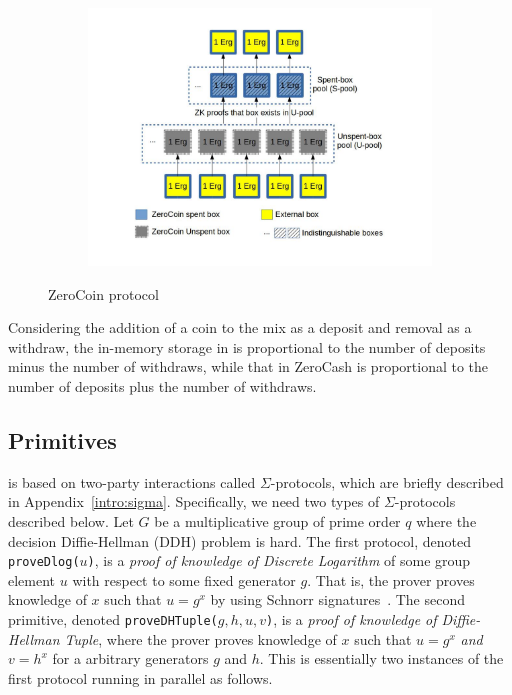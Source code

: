 \documentclass[11pt]{article}
\begin{document}
\begin{figure}
	\centering
	\begin{subfigure}{.8\textwidth}
		\centering
		\includegraphics[width=\linewidth]{ZeroCoin.jpg}
	\end{subfigure}
	\caption{ZeroCoin protocol}
	\label{fig:zerocoin}
\end{figure}

Considering the addition of a coin to the mix as a deposit and removal as a withdraw, the in-memory storage in \algname is proportional to the number of deposits minus the number of withdraws, while that in ZeroCash is proportional to the number of deposits plus the number of withdraws.  


\subsection{Primitives} 

\algname is based on two-party interactions called $\Sigma$-protocols, which are briefly described in Appendix~\ref{intro:sigma}. 
Specifically, we need two types of $\Sigma$-protocols described below. Let $G$ be a multiplicative group of prime order $q$ where the decision Diffie-Hellman (DDH) problem is hard. The first protocol, denoted \texttt{proveDlog($u$)}, is a {\em proof of knowledge of Discrete Logarithm} of some group element $u$ with respect to some fixed generator $g$. That is, the prover proves knowledge of $x$ such that $u = g^x$ by using Schnorr signatures~\cite{Sch91}. %
The second primitive, denoted \texttt{proveDHTuple($g, h, u, v$)}, is a {\em proof of knowledge of Diffie-Hellman Tuple}, where the prover proves knowledge of $x$ such that $u = g^x$ {\em and} $v = h^x$ for a arbitrary generators $g$ and $h$. This is essentially two instances of the first protocol running in parallel as follows.
\end{document}
